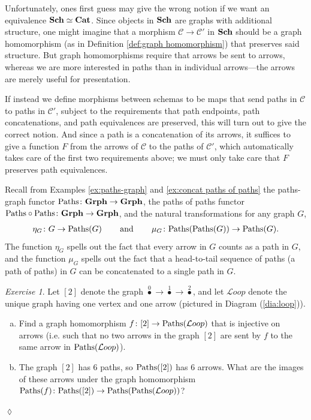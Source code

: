 \documentclass{book}
\def\tn{\textnormal}
\def\mc{\mathcal}
\def\Paths{\tn{Paths}}
\def\hsp{\hspace{.3in}}
\def\to{\rightarrow}
\def\taking{\colon}
\newcommand{\LMO}[1]{\stackrel{#1}{\bullet}}
\def\Cat{{\bf Cat}}
\def\Grph{{\bf Grph}}
\def\mcC{\mc{C}}
\def\mcL{\mc{L}}
\def\Loop{{\mcL oop}}
\theoremstyle{remark}
\newtheorem{exc}[subsubsection]{Exercise}
\newenvironment{exercise}{\begin{exc}}{\hspace*{\fill}$\lozenge$\end{exc}}
\theoremstyle{definition}
\def\Sch{{\bf Sch}}
\def\sexc{\begin{enumerate}[a.)]\setlength{\itemsep}{.1cm}\setlength{\parskip}{.1cm}\item}
\def\next{\item}
\def\endsexc{\end{enumerate}}
\begin{document}
Unfortunately, ones first guess may give the wrong notion if we want an equivalence $\Sch\simeq\Cat$. Since objects in $\Sch$ are graphs with additional structure, one might imagine that a morphism $\mcC\to\mcC'$ in $\Sch$ should be a graph homomorphism (as in Definition \ref{def:graph homomorphism}) that preserves said structure. But graph homomorphisms require that arrows be sent to arrows, whereas we are more interested in paths than in individual arrows---the arrows are merely useful for presentation. 

If instead we define morphisms between schemas to be maps that send paths in $\mcC$ to paths in $\mcC'$, subject to the requirements that path endpoints, path concatenations, and path equivalences are preserved, this will turn out to give the correct notion. And since a path is a concatenation of its arrows, it suffices to give a function $F$ from the arrows of $\mcC$ to the paths of $\mcC'$, which automatically takes care of the first two requirements above; we must only take care that $F$ preserves path equivalences.

Recall from Examples \ref{ex:paths-graph} and \ref{ex:concat paths of paths} the paths-graph functor $\Paths\taking\Grph\to\Grph$,\index{a functor!$\Paths\taking\Grph\to\Grph$} the paths of paths functor $\Paths\circ\Paths\taking\Grph\to\Grph$, and the natural transformations for any graph $G$, 
\begin{align}\label{dia:proto paths monad}
\eta_G\taking G\to\Paths(G)\hsp\tn{and}\hsp\mu_G\taking\Paths(\Paths(G))\to\Paths(G).
\end{align}
The function $\eta_G$ spells out the fact that every arrow in $G$ counts as a path in $G$, and the function $\mu_G$ spells out the fact that a head-to-tail sequence of paths (a path of paths) in $G$ can be concatenated to a single path in $G$.

\begin{exercise}
Let $[2]$ denote the graph $\LMO{0}\to\LMO{1}\to\LMO{2}$, and let $\Loop$ denote the unique graph having one vertex and one arrow (pictured in Diagram (\ref{dia:loop})).
\sexc Find a graph homomorphism $f\taking[2]\to\Paths(\Loop)$ that is injective on arrows (i.e. such that no two arrows in the graph $[2]$ are sent by $f$ to the same arrow in $\Paths(\Loop)$).
\next The graph $[2]$ has 6 paths, so $\Paths([2])$ has 6 arrows. What are the images of these arrows under the graph homomorphism $\Paths(f)\taking\Paths([2])\to\Paths(\Paths(\Loop))$? 
\endsexc
\end{exercise}
\end{document}
